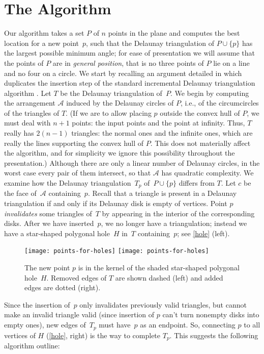\documentclass{cccg13}
\newcommand\arr{\mathcal A}
\begin{document}
\section{The Algorithm}
Our algorithm takes a set $P$ of $n$ points in the plane and computes the best location for a new point~$p$, such that the Delaunay triangulation of $P\cup\{p\}$ has the largest possible minimum angle; for ease of presentation we will assume that the points of $P$ are in \emph{general position}, that is no three points of $P$ lie on a line and no four on a circle.  We start by recalling an argument detailed in \cite{orig} which duplicates the insertion step of the standard incremental Delaunay triangulation algorithm \cite{incremental}.  Let $T$ be the Delaunay triangulation of~$P$.  We begin by computing the arrangement $\arr$ induced by the Delaunay circles of $P$, i.e., of the circumcircles of the triangles of $T$.  (If we are to allow placing $p$ outside the convex hull of $P$, we must deal with $n+1$ points: the input points and the point at infinity.  Thus, $T$ really has $2(n-1)$ triangles: the normal ones and the infinite ones, which are really the lines supporting the convex hull of $P$.  This does not materially affect the algorithm, and for simplicity we ignore this possibility throughout the presentation.)  Although there are only a linear number of Delaunay circles, in the worst case every pair of them intersect, so that $\arr$ has quadratic complexity.  We examine how the Delaunay triangulation~$T_p$ of~$P\cup\{p\}$ differs from $T$.  Let $c$ be the face of~$\arr$ containing~$p$.  Recall that a triangle is present in a Delaunay triangulation if and only if its Delaunay disk is empty of vertices.  Point $p$ \emph{invalidates} some triangles of~$T$ by appearing in the interior of the corresponding disks. After we have inserted~$p$, we no longer have a triangulation; instead we have a star-shaped polygonal hole~$H$ in~$T$ containing~$p$; see \autoref{hole} (left).
\begin{figure*}
\centering
\texttt{[image: points-for-holes]}\hfil
\texttt{[image: points-for-holes]}
\caption{\label{hole}The new point $p$ is in the kernel of the shaded star-shaped polygonal hole~$H$.  Removed edges of $T$ are shown dashed (left) and added edges are dotted (right).}
\end{figure*}
Since the insertion of~$p$ only invalidates previously valid triangles, but cannot make an invalid triangle valid (since insertion of $p$ can't turn nonempty disks into empty ones), new edges of~$T_p$ must have~$p$ as an endpoint.  So, connecting $p$ to all vertices of $H$ (\autoref{hole}, right) is the way to complete $T_p$.  This suggests the following algorithm outline:
\end{document}
